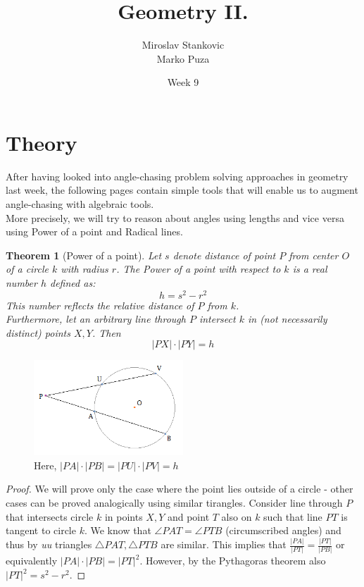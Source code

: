 \documentclass[11pt,a5paper]{article}
\title{\textbf{Geometry II.}}
\date{Week 9}
\author{Miroslav Stankovic\\ Marko Puza}
\newtheorem*{Theorem}{Theorem}
\begin{document}
\maketitle

\section{Theory}
After having looked into angle-chasing problem solving approaches in geometry last week, the following pages contain simple tools that will enable us to augment angle-chasing with algebraic tools.\\
More precisely, we will try to reason about angles using lengths and vice versa using Power of a point and Radical lines.

\begin{Theorem}[Power of a point]
Let $s$ denote distance of point $P$ from center $O$ of a circle $k$ with radius $r$. The \emph{Power of a point} with respect to $k$ is a real number $h$ defined as: \[h = s^2 - r^2\]
This number reflects the relative distance of $P$ from $k$. \\
Furthermore, let an arbitrary line through $P$ intersect $k$ in (not necessarily distinct) points $X, Y$. Then \[|PX|\cdot|PY| = h\]
\end{Theorem}

\begin{figure}[h] \begin{center}
\includegraphics[width=0.5\textwidth]{power}
\caption{Here, $|PA|\cdot|PB| = |PU|\cdot|PV| = h$}
\end{center} \end{figure}

\begin{proof}
We will prove only the case where the point lies outside of a circle - other cases can be proved analogically using similar tirangles.
Consider line through $P$ that intersects circle $k$ in points $X, Y$ and point $T$ also on $k$ such that line $PT$ is tangent to circle $k$. We know that $\angle PAT = \angle PTB$ (circumscribed angles) and thus by \emph{uu} triangles $\triangle PAT, \triangle PTB$ are similar. This implies that $\frac{|PA|}{|PT|} = \frac{|PT|}{|PB|}$ or equivalently $|PA|\cdot|PB| = |PT|^2$. However, by the Pythagoras theorem also $|PT|^2 = s^2 - r^2$.
\end{proof}
\end{document}
